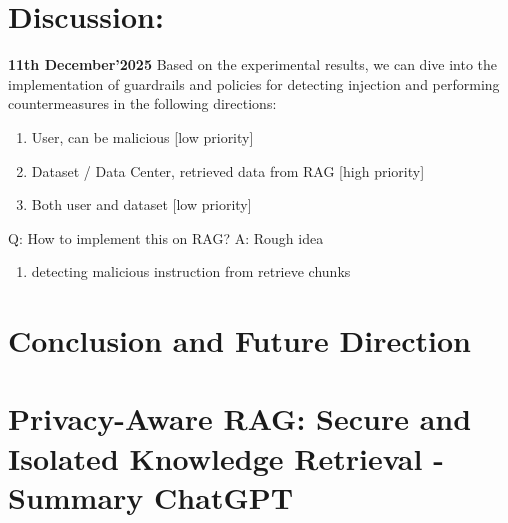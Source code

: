 \documentclass[conference, anonymous]{IEEEtran}
\begin{document}
\section{Discussion:}
\textbf{11th December'2025} \newline 
Based on the experimental results, we can dive into the implementation of guardrails and policies for detecting injection and performing countermeasures in the following directions:
\begin{enumerate}
    \item User, can be malicious [low priority]
    \item Dataset / Data Center, retrieved data from RAG [high priority]
    \item Both user and dataset [low priority]
\end{enumerate}
Q: How to implement this on RAG? \newline
A: Rough idea
\begin{enumerate}
    \item detecting malicious instruction from retrieve chunks
\end{enumerate}


\section{Conclusion and Future Direction}
\label{sec: conclusion}







\section{Privacy-Aware RAG: Secure and Isolated Knowledge Retrieval - Summary ChatGPT}
\end{document}
